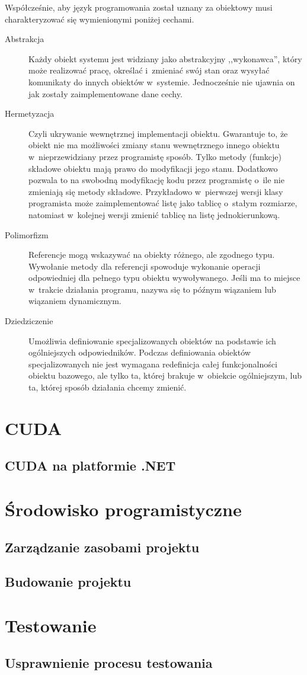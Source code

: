 Współcześnie, aby język programowania został uznany za obiektowy musi charakteryzować się wymienionymi poniżej cechami.
\begin{description}
	\item[Abstrakcja] Każdy obiekt systemu jest widziany jako abstrakcyjny ,,wykonawca'', który może realizować pracę, określać i~zmieniać swój stan oraz wysyłać komunikaty do innych obiektów w~systemie. Jednocześnie nie ujawnia on jak zostały zaimplementowane dane cechy.
	\item[Hermetyzacja] Czyli ukrywanie wewnętrznej implementacji obiektu. Gwarantuje to, że obiekt nie ma możliwości zmiany stanu wewnętrznego innego obiektu w~nieprzewidziany przez programistę sposób. Tylko metody (funkcje) składowe obiektu mają prawo do modyfikacji jego stanu. Dodatkowo pozwala to na swobodną modyfikację kodu przez programistę o~ile nie zmieniają się metody składowe. Przykładowo w~pierwszej wersji klasy programista może zaimplementować listę jako tablicę o~stałym rozmiarze, natomiast w~kolejnej wersji zmienić tablicę na listę jednokierunkową.
	\item[Polimorfizm] Referencje mogą wskazywać na obiekty różnego, ale zgodnego typu. Wywołanie metody dla referencji spowoduje wykonanie operacji odpowiedniej dla pełnego typu obiektu wywoływanego. Jeśli ma to miejsce w~trakcie działania programu, nazywa się to późnym wiązaniem lub wiązaniem dynamicznym.
	\item[Dziedziczenie] Umożliwia definiowanie specjalizowanych obiektów na podstawie ich ogólniejszych odpowiedników. Podczas definiowania obiektów specjalizowanych nie jest wymagana redefinicja całej funkcjonalności obiektu bazowego, ale tylko ta, której brakuje w~obiekcie ogólniejszym, lub ta, której sposób działania chcemy zmienić.
	
\end{description}

\section{CUDA}

\subsection{CUDA na platformie .NET}

\section{Środowisko programistyczne}

\subsection{Zarządzanie zasobami projektu}

\subsection{Budowanie projektu}

\section{Testowanie}

\subsection{Usprawnienie procesu testowania}

